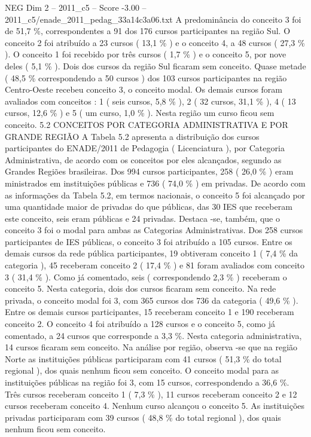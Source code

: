 \begin{textsample}{NEG Dim 2 – 2011\_c5 – Score -3.00 – 2011\_c5/enade\_2011\_pedag\_33a14c3a06.txt}
A predominância do conceito 3 foi de 51,7 \%, correspondentes a 91 dos 176 cursos participantes na região Sul.
O conceito 2 foi atribuído a 23 cursos ( 13,1 \% ) e o conceito 4, a 48 cursos ( 27,3 \% ).
O conceito 1 foi recebido por três cursos ( 1,7 \% ) e o conceito 5, por nove deles ( 5,1 \% ).
Dois dos cursos da região Sul ficaram sem conceito.
Quase metade ( 48,5 \% correspondendo a 50 cursos ) dos 103 cursos participantes na região Centro-Oeste recebeu conceito 3, o conceito modal.
Os demais cursos foram avaliados com conceitos : 1 ( seis cursos, 5,8 \% ), 2 ( 32 cursos, 31,1 \% ), 4 ( 13 cursos, 12,6 \% ) e 5 ( um curso, 1,0 \% ).
Nesta região um curso ficou sem conceito. 5.2 CONCEITOS POR CATEGORIA ADMINISTRATIVA E POR GRANDE REGIÃO A Tabela 5.2 apresenta a distribuição dos cursos participantes do ENADE/2011 de Pedagogia ( Licenciatura ), por Categoria Administrativa, de acordo com os conceitos por eles alcançados, segundo as Grandes Regiões brasileiras.
Dos 994 cursos participantes, 258 ( 26,0 \% ) eram ministrados em instituições públicas e 736 ( 74,0 \% ) em privadas.
De acordo com as informações da Tabela 5.2, em termos nacionais, o conceito 5 foi alcançado por uma quantidade maior de privadas do que públicas, das 30 IES que receberam este conceito, seis eram públicas e 24 privadas.
Destaca -se, também, que o conceito 3 foi o modal para ambas as Categorias Administrativas.
Dos 258 cursos participantes de IES públicas, o conceito 3 foi atribuído a 105 cursos.
Entre os demais cursos da rede pública participantes, 19 obtiveram conceito 1 ( 7,4 \% da categoria ), 45 receberam conceito 2 ( 17,4 \% ) e 81 foram avaliados com conceito 3 ( 31,4 \% ).
Como já comentado, seis ( correspondendo 2,3 \% ) receberam o conceito 5.
Nesta categoria, dois dos cursos ficaram sem conceito.
Na rede privada, o conceito modal foi 3, com 365 cursos dos 736 da categoria ( 49,6 \% ).
Entre os demais cursos participantes, 15 receberam conceito 1 e 190 receberam conceito 2.
O conceito 4 foi atribuído a 128 cursos e o conceito 5, como já comentado, a 24 cursos que corresponde a 3,3 \%.
Nesta categoria administrativa, 14 cursos ficaram sem conceito.
Na análise por região, observa -se que na região Norte as instituições públicas participaram com 41 cursos ( 51,3 \% do total regional ), dos quais nenhum ficou sem conceito.
O conceito modal para as instituições públicas na região foi 3, com 15 cursos, correspondendo a 36,6 \%.
Três cursos receberam conceito 1 ( 7,3 \% ), 11 cursos receberam conceito 2 e 12 cursos receberam conceito 4.
Nenhum curso alcançou o conceito 5.
As instituições privadas participaram com 39 cursos ( 48,8 \% do total regional ), dos quais nenhum ficou sem conceito.

\end{textsample}
